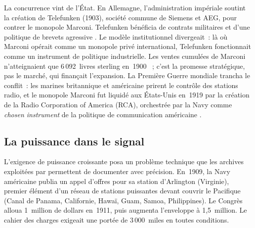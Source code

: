 %
La concurrence vint de l'État. En Allemagne, l'administration impériale soutint la création de Telefunken (1903), société commune de Siemens et AEG, pour contrer le monopole Marconi. Telefunken bénéficia de contrats militaires et d'une politique de brevets agressive \parencite{kooij_information_2022, headrick_invisible_1991}. Le modèle institutionnel divergeait~: là où Marconi opérait comme un monopole privé international, Telefunken fonctionnait comme un instrument de politique industrielle. Les ventes cumulées de Marconi n'atteignaient que 6\,092~livres sterling en~1900 \parencite{kooij_information_2022}~; c'est la promesse stratégique, pas le marché, qui finançait l'expansion. La Première Guerre mondiale trancha le conflit~: les marines britannique et américaine prirent le contrôle des stations radio, et le monopole Marconi fut liquidé aux États-Unis en~1919 par la création de la Radio Corporation of America (RCA), orchestrée par la Navy comme \og \emph{chosen instrument}\fg{} de la politique de communication américaine \parencite{aitken_continuous_1985, kooij_information_2022}.

%


\subsection{La puissance dans le signal}\label{subsec:puissance}

%
L'exigence de puissance croissante posa un problème technique que les archives exploitées par \textcite{aitken_continuous_1985} permettent de documenter avec précision. En~1909, la Navy américaine publia un appel d'offres pour sa station d'Arlington (Virginie), premier élément d'un réseau de stations puissantes devant couvrir le Pacifique (Canal de Panama, Californie, Hawaï, Guam, Samoa, Philippines). Le Congrès alloua 1~million de dollars en~1911, puis augmenta l'enveloppe à 1,5~million. Le cahier des charges exigeait une portée de 3\,000~miles en toutes conditions.

